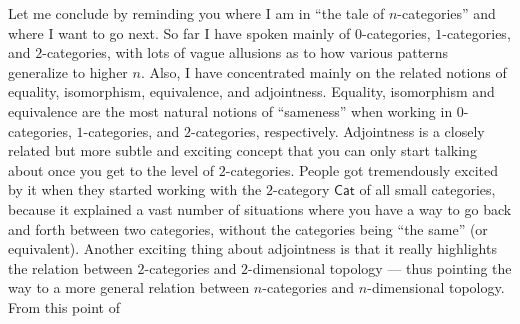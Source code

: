 \documentclass{article}
\begin{document}
Let me conclude by reminding you where I am in ``the tale of
\(n\)-categories'' and where I want to go next. So far I have spoken
mainly of 0-categories, \(1\)-categories, and \(2\)-categories, with
lots of vague allusions as to how various patterns generalize to higher
\(n\). Also, I have concentrated mainly on the related notions of
equality, isomorphism, equivalence, and adjointness. Equality,
isomorphism and equivalence are the most natural notions of ``sameness''
when working in 0-categories, \(1\)-categories, and \(2\)-categories,
respectively. Adjointness is a closely related but more subtle and
exciting concept that you can only start talking about once you get to
the level of \(2\)-categories. People got tremendously excited by it
when they started working with the \(2\)-category \(\mathsf{Cat}\) of
all small categories, because it explained a vast number of situations
where you have a way to go back and forth between two categories,
without the categories being ``the same'' (or equivalent). Another
exciting thing about adjointness is that it really highlights the
relation between \(2\)-categories and \(2\)-dimensional topology ---
thus pointing the way to a more general relation between
\(n\)-categories and \(n\)-dimensional topology. From this point of
\end{document}

